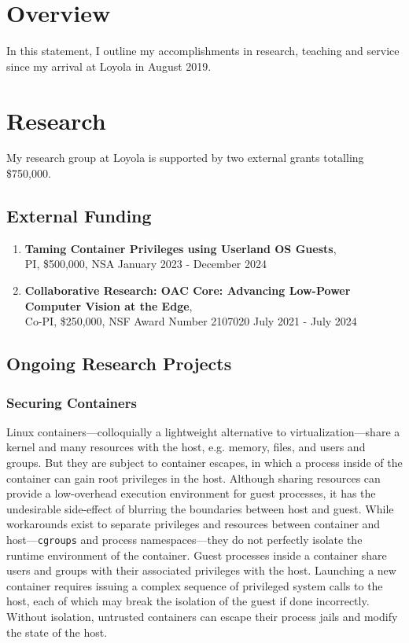 \documentclass[10pt,onecolumn]{article}
\begin{document}
\section{Overview}

In this statement, I outline my accomplishments in research, teaching and service since my arrival at Loyola in August 2019.



\section{Research}

My research group at Loyola is supported by two external grants totalling \$750,000.

\subsection{External Funding}

\begin{enumerate}
\item 

    {\bf Taming Container Privileges using Userland OS Guests}, \\
    PI, \$500,000, NSA January 2023 - December 2024 

\item
    {\bf Collaborative Research: OAC Core: Advancing Low-Power Computer Vision at the Edge}, \\
    Co-PI, \$250,000, NSF Award Number 2107020 July 2021 - July 2024 
	
\end{enumerate}

\subsection{Ongoing Research Projects}


\subsubsection{Securing Containers}


Linux containers---colloquially a lightweight alternative to virtualization---share a kernel and many resources with the host, e.g. memory, files, and users and groups.
But they are subject to container escapes, in which a process inside of the container can gain root privileges in the host.
Although sharing resources can provide a low-overhead execution environment for guest processes, it has the undesirable side-effect of blurring the boundaries between host and guest.
While workarounds exist to separate privileges and resources between container and host---\texttt{cgroups} and process namespaces---they do not perfectly isolate the runtime environment of the container.
Guest processes inside a container share users and groups with their associated privileges with the host.
Launching a new container requires issuing a complex sequence of privileged system calls to the host, each of which may break the isolation of the guest if done incorrectly.
Without isolation, untrusted containers can escape their process jails and modify the state of the host.
\end{document}
